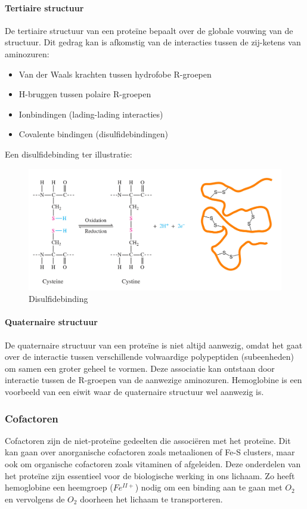 \documentclass[a4paper,kul]{kulakarticle} %
\begin{document}
\paragraph{Tertiaire structuur}
De tertiaire structuur van een proteïne bepaalt over de globale vouwing van de structuur. Dit gedrag kan is afkomstig van de interacties tussen de zij-ketens van aminozuren:
\begin{itemize}
	\item Van der Waals krachten tussen hydrofobe R-groepen
	\item H-bruggen tussen polaire R-groepen
	\item Ionbindingen (lading-lading interacties)
	\item Covalente bindingen (disulfidebindingen)
\end{itemize}
Een disulfidebinding ter illustratie:
\begin{figure}[h]
	\centering
	\includegraphics[width=0.7\linewidth]{DisulfideBinding}
	\caption[Disulfidebinding]{Disulfidebinding}
	\label{fig:disulfidebinding}
\end{figure}
\paragraph{Quaternaire structuur}
De quaternaire structuur van een proteïne is niet altijd aanwezig, omdat het gaat over de interactie tussen verschillende volwaardige polypeptiden (subeenheden) om samen een groter geheel te vormen. Deze associatie kan ontstaan door interactie tussen de R-groepen van de aanwezige aminozuren. Hemoglobine is een voorbeeld van een eiwit waar de quaternaire structuur wel aanwezig is.
\subsubsection{Cofactoren} 
Cofactoren zijn de niet-proteïne gedeelten die associëren met het proteïne. Dit kan gaan over anorganische cofactoren zoals metaalionen of Fe-S clusters, maar ook om organische cofactoren zoals vitaminen of afgeleiden. Deze onderdelen van het proteïne zijn essentieel voor de biologische werking in ons lichaam. Zo heeft hemoglobine een heemgroep ($Fe^{II+}$) nodig om een binding aan te gaan met $O_2$ en vervolgens de $O_2$ doorheen het lichaam te transporteren. 
\newpage
\end{document}
